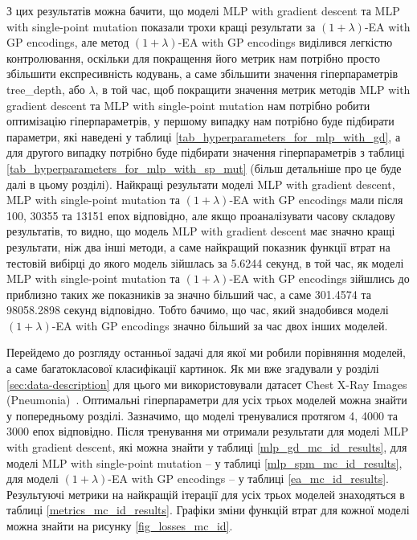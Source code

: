 З цих результатів можна бачити, що моделі MLP with gradient descent та MLP with single-point mutation показали трохи кращі результати за $(1+\lambda)$-EA with GP encodings, але метод $(1+\lambda)$-EA with GP encodings виділився легкістю контролювання, оскільки для покращення його метрик нам потрібно просто збільшити експресивність кодувань, а саме збільшити значення гіперпараметрів tree\_depth, або $\lambda$, в той час, щоб покращити значення метрик методів MLP with gradient descent та MLP with single-point mutation нам потрібно робити оптимізацію гіперпараметрів, у першому випадку нам потрібно буде підбирати параметри, які наведені у таблиці \ref{tab_hyperparameters_for_mlp_with_gd}, а для другого випадку потрібно буде підбирати значення гіперпараметрів з таблиці \ref{tab_hyperparameters_for_mlp_with_sp_mut} (більш детальніше про це буде далі в цьому розділі). Найкращі результати моделі MLP with gradient descent, MLP with single-point mutation та $(1+\lambda)$-EA with GP encodings мали після 100, 30355 та 13151 епох відповідно, але якщо проаналізувати часову складову результатів, то видно, що модель MLP with gradient descent має значно кращі результати, ніж два інші методи, а саме найкращий показник функції втрат на тестовій вибірці до якого модель зійшлась за 5.6244 секунд, в той час, як моделі MLP with single-point mutation та $(1+\lambda)$-EA with GP encodings зійшлись до приблизно таких же показників за значно більший час, а саме 301.4574 та 98058.2898 секунд відповідно. Тобто бачимо, що час, який знадобився моделі $(1+\lambda)$-EA with GP encodings значно більший за час двох інших моделей.

Перейдемо до розгляду останньої задачі для якої ми робили порівняння моделей, а саме багатокласової класифікації картинок. Як ми вже згадували у розділі \ref{sec:data-description} для цього ми використовували датасет Chest X-Ray Images (Pneumonia)~\cite{ct32}. Оптимальні гіперпараметри для усіх трьох моделей можна знайти у попередньому розділі. Зазначимо, що моделі тренувалися протягом 4, 4000 та 3000 епох відповідно. Після тренування ми отримали результати для моделі MLP with gradient descent, які можна знайти у таблиці \ref{mlp_gd_mc_id_results}, для моделі MLP with single-point mutation -- у таблиці \ref{mlp_spm_mc_id_results}, для моделі $(1+\lambda)$-EA with GP encodings -- у таблиці \ref{ea_mc_id_results}. Результуючі метрики на найкращій ітерації для усіх трьох моделей знаходяться в таблиці \ref{metrics_mc_id_results}. Графіки зміни функцій втрат для кожної моделі можна знайти на рисунку \ref{fig_losses_mc_id}.

